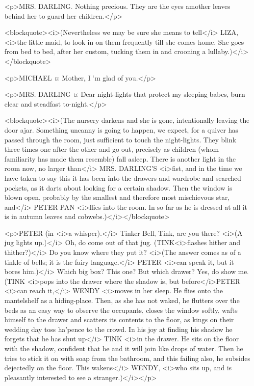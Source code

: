<p>MRS. DARLING. Nothing precious. They are the eyes amother leaves behind her to guard her children.</p>

<blockquote><i>(Nevertheless we may be sure she means to tell</i> LIZA, <i>the little maid, to look in on them frequently till she comes home. She goes from bed to bed, after her custom, tucking them in and crooning a lullaby.)</i></blockquote>

<p>MICHAEL ¤
Mother, I 'm glad of you.</p>

<p>MRS. DARLING ¤
Dear night-lights that protect my sleeping babes, burn clear and steadfast to-night.</p>

<blockquote><i>(The nursery darkens and she is gone, intentionally leaving the door ajar. Something uncanny is going to happen, we expect, for a quiver has passed through the room, just sufficient to touch the night-lights. They blink three times one after the other and go out, precisely as children (whom familiarity has made them resemble) fall asleep. There is another light in the room now, no larger than</i> MRS. DARLING'S <i>fist, and in the time we have taken to say this it has been into the drawers and wardrobe and searched pockets, as it darts about looking for a certain shadow. Then the window is blown open, probably by the smallest and therefore most mischievous star, and</i> PETER PAN <i>flies into the room. In so far as he is dressed at all it is in autumn leaves and cobwebs.)</i></blockquote>

<p>PETER (in <i>a whisper).</i> Tinker Bell, Tink, are you there? <i>(A jug lights up.)</i> Oh, do come out of that jug. (TINK<i>flashes hither and thither?)</i> Do you know where they put it? <i>(The answer comes as of a tinkle of bells; it is the fairy language.</i> PETER <i>can speak it, but it bores him.)</i> Which big box? This one? But which drawer? Yes, do show me. (TINK <i>pops into the drawer where the shadow is, but before</i>PETER <i>can reach it,</i> WENDY <i>moves in her sleep. He flies onto the mantelshelf as a hiding-place. Then, as she has not waked, he flutters over the beds as an easy way to observe the occupants, closes the window softly, wafts himself to the drawer and scatters its contents to the floor, as kings on their wedding day toss ha'pence to the crowd. In his joy at finding his shadow he forgets that he has shut up</i> TINK <i>in the drawer. He sits on the floor with the shadow, confident that he and it will join like drops of water. Then he tries to stick it on with soap from the bathroom, and this failing also, he subsides dejectedly on the floor. This wakens</i> WENDY, <i>who sits up, and is pleasantly interested to see a stranger.)</i></p>


